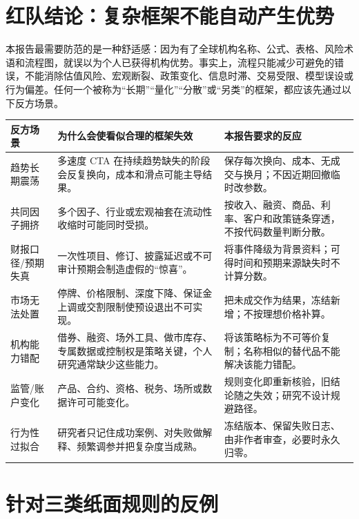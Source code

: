 \section{红队结论：复杂框架不能自动产生优势}

本报告最需要防范的是一种舒适感：因为有了全球机构名称、公式、表格、风险术语和流程图，就误以为个人已获得机构优势。事实上，流程只能减少可避免的错误，不能消除估值风险、宏观断裂、政策变化、信息时滞、交易受限、模型误设或行为偏差。任何一个被称为“长期”“量化”“分散”或“另类”的框架，都应该先通过以下反方场景。

\begin{exhibitbox}
\small
\begin{tabularx}{\exhibitboxwidth}{L{2.8cm}X L{3.85cm}}
\toprule
\textbf{反方场景} & \textbf{为什么会使看似合理的框架失效} & \textbf{本报告要求的反应} \\
\midrule
趋势长期震荡 & 多速度 CTA 在持续趋势缺失的阶段会反复换向，成本和滑点可能主导结果。 & 保存每次换向、成本、无成交与换月；不因近期回撤临时改参数。 \\
共同因子拥挤 & 多个因子、行业或宏观袖套在流动性收缩时可能同时受损。 & 按收入、融资、商品、利率、客户和政策链条穿透，不按代码数量判断分散。 \\
财报口径/预期失真 & 一次性项目、修订、披露延迟或不可审计预期会制造虚假的“惊喜”。 & 将事件降级为背景资料；可得时间和预期来源缺失时不计算分数。 \\
市场无法处置 & 停牌、价格限制、深度下降、保证金上调或交割限制使预设退出不可实现。 & 把未成交作为结果，冻结新增；不按理想价格补算。 \\
机构能力错配 & 借券、融资、场外工具、做市库存、专属数据或控制权是策略关键，个人研究通常缺少这些能力。 & 将该策略标为不可等价复制；名称相似的替代品不能解决该能力错配。 \\
监管/账户变化 & 产品、合约、资格、税务、场所或数据许可可能变化。 & 规则变化即重新核验，旧结论随之失效；研究不设计规避路径。 \\
行为性过拟合 & 研究者只记住成功案例、对失败做解释、频繁调参并把复杂度当成熟。 & 冻结版本、保留失败日志、由非作者审查，必要时永久归零。 \\
\bottomrule
\end{tabularx}
\end{exhibitbox}

\section{针对三类纸面规则的反例}


